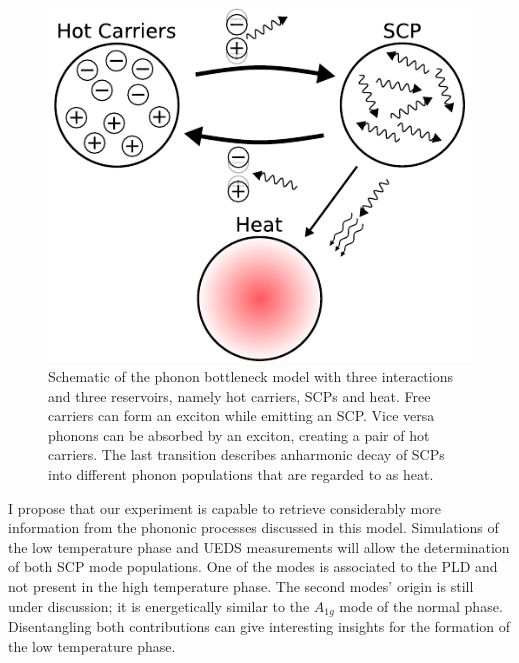\begin{figure}[!t]
	\begin{minipage}{0.5\columnwidth}
		\includegraphics[width=\columnwidth]{figs/phonon_bottleneck.pdf}
	\end{minipage}
	\hspace{0.04\columnwidth}
	\begin{minipage}{0.45\columnwidth}
		\caption{Schematic of the phonon bottleneck model with three interactions and three reservoirs, namely hot carriers, SCPs and heat. Free carriers can form an exciton while emitting an SCP. Vice versa phonons can be absorbed by an exciton, creating a pair of hot carriers. The last transition describes anharmonic decay of SCPs into different phonon populations that are regarded to as heat.}
		\label{fig:model}
	\end{minipage}
\end{figure}

I propose that our experiment is capable to retrieve considerably more information from the phononic processes discussed in this model.
Simulations of the low temperature phase and \ac{UEDS} measurements will allow the determination of both \ac{SCP} mode populations.
One of the modes is associated to the \ac{PLD} and not present in the high temperature phase.
The second modes' origin is still under discussion; it is energetically similar to the $A_{1g}$ mode of the normal phase\cite{holy1977}.
Disentangling both contributions can give interesting insights for the formation of the low temperature phase.

